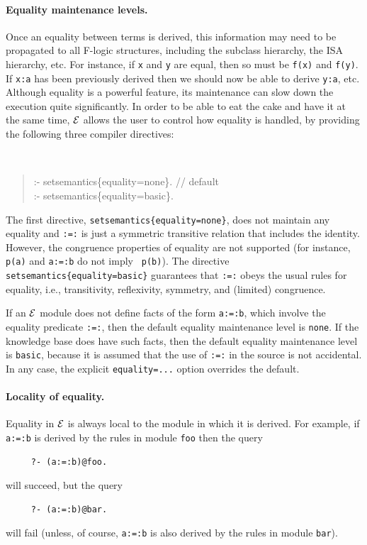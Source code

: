 \documentclass[11pt]{article}
\newcommand{\ERGO}{\mbox{\ensuremath{\cal{E}}\smaller{{\sc{RGO}}}}\xspace}
\newcommand{\FLSYSTEM}{\ERGO}
\newcommand{\fl}{\mbox{F-logic}\xspace}
\begin{document}
\paragraph{Equality maintenance levels.}
Once an equality between terms is derived, this information may need to be
propagated to all \fl 
structures, including the subclass hierarchy, the ISA hierarchy, etc.
For instance, if {\tt x} and {\tt y} are equal, then so must be {\tt f(x)}
and {\tt f(y)}. If {\tt x:a} has been previously derived then we should now
be able to derive {\tt y:a}, etc. Although equality is a powerful
feature, its maintenance can slow down the execution quite significantly.
In order to be able to eat the cake and have it at the same time, \FLSYSTEM
allows the user to control how equality is handled,
by providing the following three compiler directives:
{\tt
\begin{quote}
:- setsemantics\{equality=none\}.  // default\\
:- setsemantics\{equality=basic\}.
\end{quote}
}

\noindent
The first directive, \mbox{\tt setsemantics\{equality=none\}}, does not
maintain any equality and {\tt :=:} is just a symmetric transitive relation
that includes the identity. However,
the congruence properties of equality are not
supported (for instance, {\tt p(a)} and {\tt a:=:b} do not imply {\tt
  p(b)}). The directive
\mbox{\tt setsemantics\{equality=basic\}} guarantees that {\tt :=:} obeys the
usual rules for equality, i.e., transitivity, reflexivity,
symmetry, and (limited) congruence.

If an \FLSYSTEM module does not define facts of the form {\tt a:=:b}, which
involve the equality predicate {\tt :=:}, then the default equality
maintenance level is {\tt none}. If the knowledge base does have such facts,
then the default equality maintenance level is {\tt basic}, because it is
assumed that the use of {\tt :=:} in the source is not accidental.
In any case, the explicit {\tt equality=...} option overrides the default.

\paragraph{Locality of equality.}
Equality in \FLSYSTEM is always local to the module in which it is derived.
For example, if {\tt a:=:b} is derived by the rules in module {\tt foo}
then the query
\begin{verbatim}
     ?- (a:=:b)@foo.  
\end{verbatim}
will succeed, but the query
\begin{verbatim}
     ?- (a:=:b)@bar.  
\end{verbatim}
will fail (unless, of course, {\tt a:=:b} is also derived by the rules in
module {\tt bar}).
\end{document}
